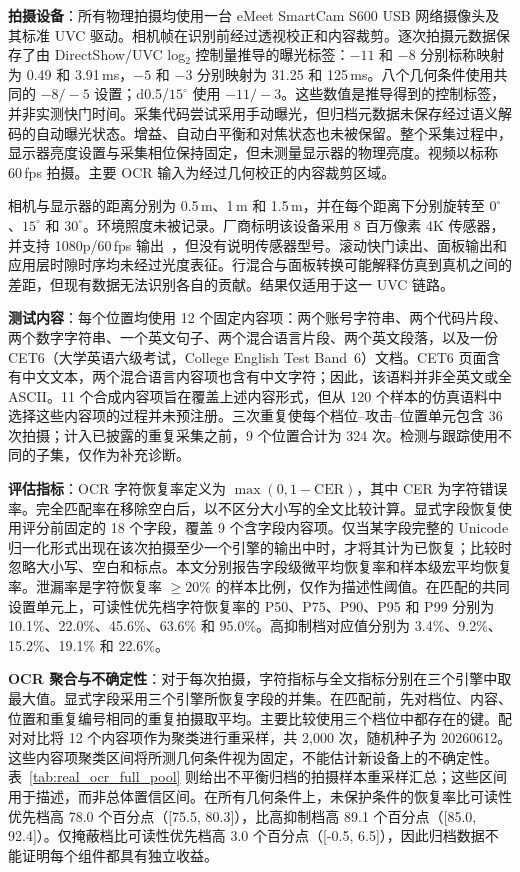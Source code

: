 \documentclass{ieeeaccess}
\begin{document}
\textbf{拍摄设备}：所有物理拍摄均使用一台 eMeet SmartCam S600 USB 网络摄像头及其标准 UVC 驱动。相机帧在识别前经过透视校正和内容裁剪。逐次拍摄元数据保存了由 DirectShow/UVC log$_2$ 控制量推导的曝光标签：$-11$ 和 $-8$ 分别标称映射为 0.49 和 3.91\,ms，$-5$ 和 $-3$ 分别映射为 31.25 和 125\,ms。八个几何条件使用共同的 $-8/-5$ 设置；d0.5/$15^{\circ}$ 使用 $-11/-3$。这些数值是推导得到的控制标签，并非实测快门时间。采集代码尝试采用手动曝光，但归档元数据未保存经过语义解码的自动曝光状态。增益、自动白平衡和对焦状态也未被保留。整个采集过程中，显示器亮度设置与采集相位保持固定，但未测量显示器的物理亮度。视频以标称 60\,fps 拍摄。主要 OCR 输入为经过几何校正的内容裁剪区域。

相机与显示器的距离分别为 0.5\,m、1\,m 和 1.5\,m，并在每个距离下分别旋转至 $0^{\circ}$、$15^{\circ}$ 和 $30^{\circ}$。环境照度未被记录。厂商标明该设备采用 8 百万像素 4K 传感器，并支持 1080p/60\,fps 输出~\cite{b_emeet_s600}，但没有说明传感器型号。滚动快门读出、面板输出和应用层时隙时序均未经过光度表征。行混合与面板转换可能解释仿真到真机之间的差距，但现有数据无法识别各自的贡献。结果仅适用于这一 UVC 链路。

\textbf{测试内容}：每个位置均使用 12 个固定内容项：两个账号字符串、两个代码片段、两个数字字符串、一个英文句子、两个混合语言片段、两个英文段落，以及一份 CET6（大学英语六级考试，College English Test Band~6）文档。CET6 页面含有中文文本，两个混合语言内容项也含有中文字符；因此，该语料并非全英文或全 ASCII。11 个合成内容项旨在覆盖上述内容形式，但从 120 个样本的仿真语料中选择这些内容项的过程并未预注册。三次重复使每个档位--攻击--位置单元包含 36 次拍摄；计入已披露的重复采集之前，9 个位置合计为 324 次。检测与跟踪使用不同的子集，仅作为补充诊断。

\textbf{评估指标}：OCR 字符恢复率定义为 $\max(0,1-\mathrm{CER})$，其中 CER 为字符错误率。完全匹配率在移除空白后，以不区分大小写的全文比较计算。显式字段恢复使用评分前固定的 18 个字段，覆盖 9 个含字段内容项。仅当某字段完整的 Unicode 归一化形式出现在该次拍摄至少一个引擎的输出中时，才将其计为已恢复；比较时忽略大小写、空白和标点。本文分别报告字段级微平均恢复率和样本级宏平均恢复率。泄漏率是字符恢复率 $\geq20\%$ 的样本比例，仅作为描述性阈值。在匹配的共同设置单元上，可读性优先档字符恢复率的 P50、P75、P90、P95 和 P99 分别为 10.1\%、22.0\%、45.6\%、63.6\% 和 95.0\%。高抑制档对应值分别为 3.4\%、9.2\%、15.2\%、19.1\% 和 22.6\%。

\textbf{OCR 聚合与不确定性}：对于每次拍摄，字符指标与全文指标分别在三个引擎中取最大值。显式字段采用三个引擎所恢复字段的并集。在匹配前，先对档位、内容、位置和重复编号相同的重复拍摄取平均。主要比较使用三个档位中都存在的键。配对对比将 12 个内容项作为聚类进行重采样，共 2,000 次，随机种子为 20260612。这些内容项聚类区间将所测几何条件视为固定，不能估计新设备上的不确定性。表~\ref{tab:real_ocr_full_pool} 则给出不平衡归档的拍摄样本重采样汇总；这些区间用于描述，而非总体置信区间。在所有几何条件上，未保护条件的恢复率比可读性优先档高 78.0 个百分点（[75.5, 80.3]），比高抑制档高 89.1 个百分点（[85.0, 92.4]）。仅掩蔽档比可读性优先档高 3.0 个百分点（[-0.5, 6.5]），因此归档数据不能证明每个组件都具有独立收益。
\end{document}
